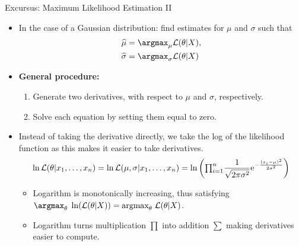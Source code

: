 \begin{frame}{Excursus: Maximum Likelihood Estimation II}
	\begin{itemize}
		\item In the case of a Gaussian distribution: find estimates for $\mu$ and $\sigma$ such that
		      \begin{align*}
			      \widehat{\mu}    & = \textstyle\argmax_{\mu} \mathcal{L}(\theta|X),   \\
			      \widehat{\sigma} & = \textstyle\argmax_{\sigma} \mathcal{L}(\theta|X)
		      \end{align*}
		\item \textbf{General procedure:}
		      \begin{enumerate}
			      \item Generate two derivatives, with respect to $\mu$ and $\sigma$, respectively.
			      \item Solve each equation by setting them equal to zero.
		      \end{enumerate}
		\item Instead of taking the derivative directly, we take the log of the likelihood function as this makes it easier to take derivatives.
		      \begin{equation*}
			      \ln{\mathcal{L}(\theta|x_1, \dots, x_n)}=\ln{\mathcal{L}(\mu, \sigma|x_1, \dots, x_n)}= \ln{\bigg({\textstyle\prod\nolimits_{i=1}^n} \frac{1}{\sqrt{2\pi \sigma^2}} {\rm e}^{-\frac{(x_i-\mu)^2}{2\sigma^2}}\bigg)}
		      \end{equation*}
		      \begin{itemize}
			      \item Logarithm is monotonically increasing, thus satisfying $\argmax_{\theta} \; \ln(\mathcal{L}(\theta|X)) = \text{argmax}_{\theta} \; \mathcal{L}(\theta|X)$.
			      \item Logarithm turns multiplication $\prod$ into addition $\sum$ making derivatives easier to compute.
		      \end{itemize}
	\end{itemize}
\end{frame}

